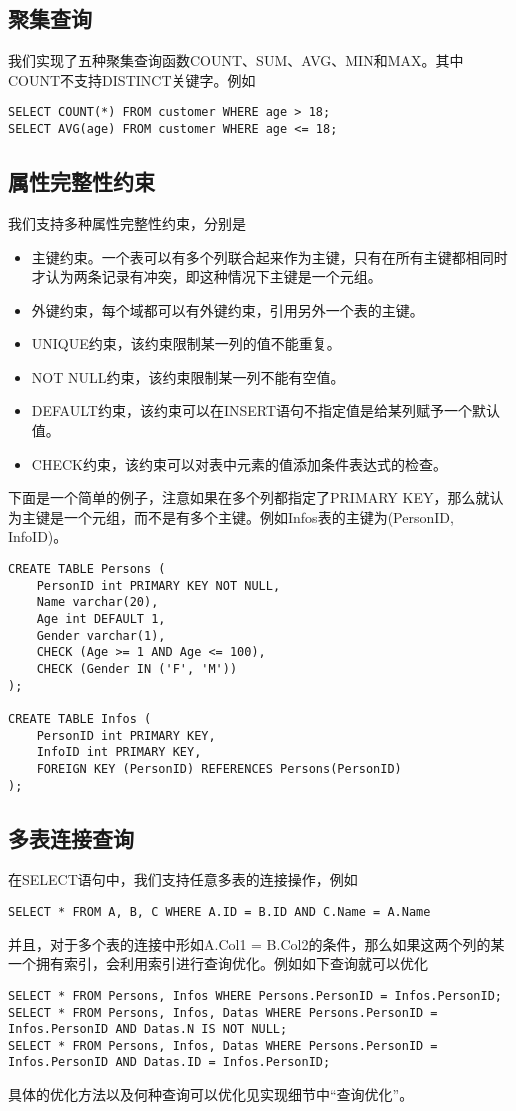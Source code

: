 \documentclass[10pt]{article}
\begin{document}
\subsection{聚集查询}
我们实现了五种聚集查询函数COUNT、SUM、AVG、MIN和MAX。其中COUNT不支持DISTINCT关键字。例如
\begin{verbatim}
SELECT COUNT(*) FROM customer WHERE age > 18;
SELECT AVG(age) FROM customer WHERE age <= 18;
\end{verbatim}
\subsection{属性完整性约束}
我们支持多种属性完整性约束，分别是
\begin{itemize}
	\item 主键约束。一个表可以有多个列联合起来作为主键，只有在所有主键都相同时才认为两条记录有冲突，即这种情况下主键是一个元组。
	\item 外键约束，每个域都可以有外键约束，引用另外一个表的主键。
	\item UNIQUE约束，该约束限制某一列的值不能重复。
	\item NOT NULL约束，该约束限制某一列不能有空值。
	\item DEFAULT约束，该约束可以在INSERT语句不指定值是给某列赋予一个默认值。
	\item CHECK约束，该约束可以对表中元素的值添加条件表达式的检查。
\end{itemize}
下面是一个简单的例子，注意如果在多个列都指定了PRIMARY KEY，那么就认为主键是一个元组，而不是有多个主键。例如Infos表的主键为(PersonID, InfoID)。
\begin{verbatim}
CREATE TABLE Persons (
    PersonID int PRIMARY KEY NOT NULL,
    Name varchar(20),
    Age int DEFAULT 1,
    Gender varchar(1),
    CHECK (Age >= 1 AND Age <= 100),
    CHECK (Gender IN ('F', 'M'))
);

CREATE TABLE Infos (
    PersonID int PRIMARY KEY,
    InfoID int PRIMARY KEY,
    FOREIGN KEY (PersonID) REFERENCES Persons(PersonID)
);
\end{verbatim}
\subsection{多表连接查询}
在SELECT语句中，我们支持任意多表的连接操作，例如
\begin{verbatim}
SELECT * FROM A, B, C WHERE A.ID = B.ID AND C.Name = A.Name
\end{verbatim}
并且，对于多个表的连接中形如A.Col1 = B.Col2的条件，那么如果这两个列的某一个拥有索引，会利用索引进行查询优化。例如如下查询就可以优化
\begin{verbatim}
SELECT * FROM Persons, Infos WHERE Persons.PersonID = Infos.PersonID;
SELECT * FROM Persons, Infos, Datas WHERE Persons.PersonID = Infos.PersonID AND Datas.N IS NOT NULL;
SELECT * FROM Persons, Infos, Datas WHERE Persons.PersonID = Infos.PersonID AND Datas.ID = Infos.PersonID;
\end{verbatim}
具体的优化方法以及何种查询可以优化见实现细节中``查询优化''。
\end{document}
